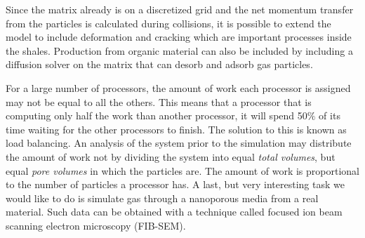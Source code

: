 Since the matrix already is on a discretized grid and the net momentum transfer from the particles is calculated during collisions, it is possible to extend the model to include deformation and cracking which are important processes inside the shales. Production from organic material can also be included by including a diffusion solver on the matrix that can desorb and adsorb gas particles.

For a large number of processors, the amount of work each processor is assigned may not be equal to all the others. This means that a processor that is computing only half the work than another processor, it will spend 50$\%$ of its time waiting for the other processors to finish. The solution to this is known as load balancing. An analysis of the system prior to the simulation may distribute the amount of work not by dividing the system into equal \textit{total volumes}, but equal \textit{pore volumes} in which the particles are. The amount of work is proportional to the number of particles a processor has. A last, but very interesting task we would like to do is simulate gas through a nanoporous media from a real material. Such data can be obtained with a technique called focused ion beam scanning electron microscopy (FIB-SEM). 